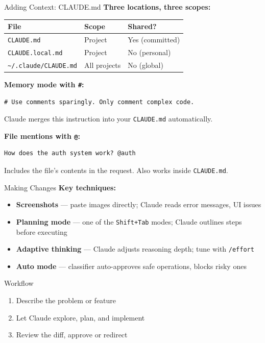 \documentclass[aspectratio=169]{beamer}
\begin{document}
\begin{frame}[fragile]{Adding Context: CLAUDE.md}
\textbf{Three locations, three scopes:}
\begin{table}
\centering\small
\begin{tabular}{lll}
\toprule
\textbf{File} & \textbf{Scope} & \textbf{Shared?} \\
\midrule
\texttt{CLAUDE.md} & Project & Yes (committed) \\
\texttt{CLAUDE.local.md} & Project & No (personal) \\
\texttt{\textasciitilde/.claude/CLAUDE.md} & All projects & No (global) \\
\bottomrule
\end{tabular}
\end{table}

\bigskip
\textbf{Memory mode with \texttt{\#}:}
\begin{lstlisting}
# Use comments sparingly. Only comment complex code.
\end{lstlisting}
Claude merges this instruction into your \texttt{CLAUDE.md} automatically.

\bigskip
\textbf{File mentions with \texttt{@}:}
\begin{lstlisting}
How does the auth system work? @auth
\end{lstlisting}
Includes the file's contents in the request. Also works inside \texttt{CLAUDE.md}.
\end{frame}

\begin{frame}{Making Changes}
\textbf{Key techniques:}
\begin{itemize}
  \item \textbf{Screenshots} --- paste images directly; Claude reads error messages, UI issues
  \item \textbf{Planning mode} --- one of the \texttt{Shift+Tab} modes; Claude outlines steps before executing
  \item \textbf{Adaptive thinking} --- Claude adjusts reasoning depth; tune with \texttt{/effort}
  \item \textbf{Auto mode} --- classifier auto-approves safe operations, blocks risky ones
\end{itemize}

\bigskip
\begin{exampleblock}{Workflow}
\begin{enumerate}
  \item Describe the problem or feature
  \item Let Claude explore, plan, and implement
  \item Review the diff, approve or redirect
\end{enumerate}
\end{exampleblock}
\end{frame}
\end{document}
